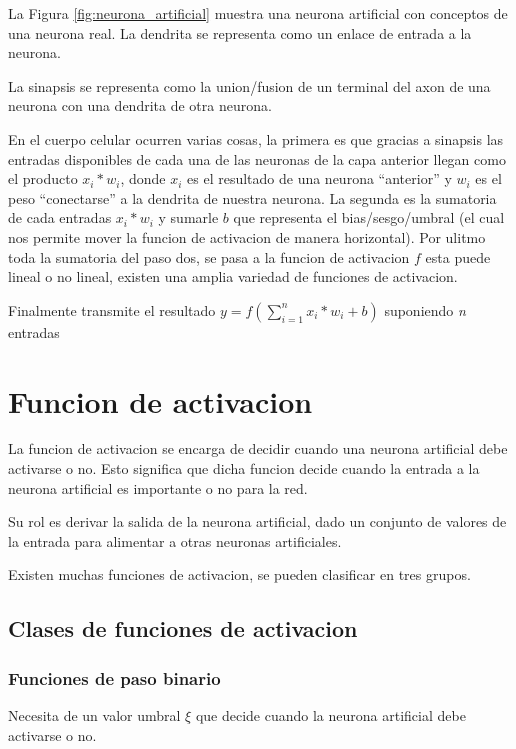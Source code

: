 \documentclass[runningheads]{llncs} %
\begin{document}
La Figura \ref{fig:neurona_artificial} muestra una neurona artificial con conceptos
de una neurona real.
La dendrita se representa como un enlace de entrada a la neurona.

La sinapsis se representa como la union/fusion de un terminal del axon de una neurona
con una dendrita de otra neurona. 

En el cuerpo celular ocurren varias cosas, la primera es que gracias a sinapsis las
entradas disponibles de cada una de las neuronas de la capa anterior llegan como el 
producto \(x_{i}*w_{i}\), donde \(x_{i}\) es el resultado de una neurona 
\textquotedblleft{anterior}\textquotedblright{} y \(w_{i}\) es el peso 
\textquotedblleft{conectarse}\textquotedblright{} a la dendrita de nuestra neurona.
La segunda es la sumatoria de cada entradas \(x_{i}*w_{i}\) y sumarle
\(b\) que representa el bias/sesgo/umbral (el cual nos permite mover la funcion
de activacion de manera horizontal).
Por ulitmo toda la sumatoria del paso dos, se pasa a la funcion de activacion \(f\)
esta puede lineal o no lineal, existen una amplia variedad de funciones de activacion.

Finalmente transmite el resultado \(y = f(\sum_{i=1}^{n}{x_{i}*w_{i}} + b)\)
suponiendo \textit{n} entradas

\section{Funcion de activacion}
La funcion de activacion se encarga de decidir cuando una neurona artificial debe activarse
o no. Esto significa que dicha funcion decide cuando la entrada a la neurona artificial
es importante o no para la red. \cite{fun-activacion}

Su rol es derivar la salida de la neurona artificial, dado un conjunto de valores de la entrada
para alimentar a otras neuronas artificiales. \cite{fun-activacion}

Existen muchas funciones de activacion, se pueden clasificar en tres grupos.
\subsection{Clases de funciones de activacion}

\subsubsection{Funciones de paso binario}
Necesita de un valor umbral \(\xi\) que decide cuando la neurona artificial debe activarse o no.
\cite{fun-activacion}
\end{document}
